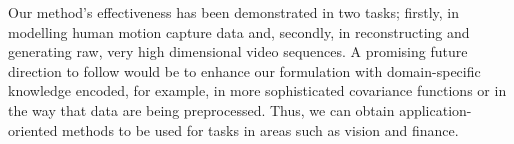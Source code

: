 \documentclass{article} %
\begin{document}
\par Our method's effectiveness has been demonstrated in two tasks;
firstly, in modelling human motion capture data and, secondly, in
reconstructing and generating raw, very high dimensional video
sequences. A promising future direction to follow would be to enhance
our formulation with domain-specific knowledge encoded, for example,
in more sophisticated covariance functions or in the way that data are
being preprocessed. Thus, we can obtain application-oriented methods
to be used for tasks in areas such as vision and finance.








%

\renewcommand*{\refname}{\begin{normalsize}References\end{normalsize}}

%
\end{document}
